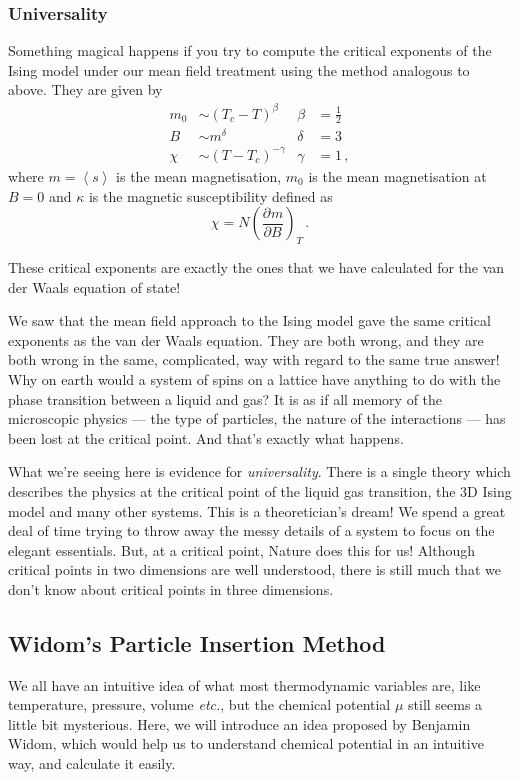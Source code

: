 \documentclass{article}
\theoremstyle{plain}\theoremheaderfont{\normalfont\bfseries}\theorembodyfont{\rmfamily}\theoremseparator{.}\newtheorem*{thm}{Theorem}\newtheorem*{law}{Law}\newtheorem*{pos}{Postulate}
\numberwithin{equation}{section}
\newcommand{\pdv}[3][]{\frac{\partial^{#1} #2}{{\partial #3}^{#1}}}
\newcommand{\eval}[1]{\left\langle #1 \right\rangle}
\begin{document}
    \subsubsection*{Universality}
    Something magical happens if you try to compute the critical exponents of the Ising model under our mean field treatment using the method analogous to above. They are given by
    \begin{align}
        m_0&\sim(T_c-T)^{\beta} & \beta&=\frac{1}{2} \\
        B&\sim m^\delta & \delta&=3 \\
        \chi&\sim(T-T_c)^{-\gamma} & \gamma&= 1\,,
    \end{align}
    where \(m=\eval{s}\) is the mean magnetisation, \(m_0\) is the mean magnetisation at \(B=0\) and \(\kappa\) is the magnetic susceptibility defined as
    \begin{equation}
        \chi=N\left(\pdv{m}{B}\right)_T\,.
    \end{equation}

    These critical exponents are exactly the ones that we have calculated for the van der Waals equation of state!

    We saw that the mean field approach to the Ising model gave the same critical exponents as the van der Waals equation. They are both wrong, and they are both wrong in the same, complicated, way with regard to the same true answer! Why on earth would a system of spins on a lattice have anything to do with the phase transition between a liquid and gas? It is as if all memory of the microscopic physics --- the type of particles, the nature of the interactions --- has been lost at the critical point. And that's exactly what happens.

    What we're seeing here is evidence for \textit{universality}. There is a single theory which describes the physics at the critical point of the liquid gas transition, the 3D Ising model and many other systems. This is a theoretician's dream! We spend a great deal of time trying to throw away the messy details of a system to focus on the elegant essentials. But, at a critical point, Nature does this for us! Although critical points in two dimensions are well understood, there is still much that we don't know about critical points in three dimensions.

    \subsection{Widom's Particle Insertion Method}
    We all have an intuitive idea of what most thermodynamic variables are, like temperature, pressure, volume \textit{etc.}, but the chemical potential \(\mu\) still seems a little bit mysterious. Here, we will introduce an idea proposed by Benjamin Widom, which would help us to understand chemical potential in an intuitive way, and calculate it easily.
\end{document}

